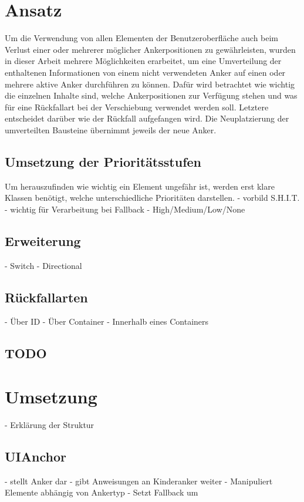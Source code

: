 	\section{Ansatz}
		Um die Verwendung von allen Elementen der Benutzeroberfläche auch beim Verlust einer oder mehrerer möglicher Ankerpositionen zu gewährleisten, wurden in dieser Arbeit mehrere Möglichkeiten erarbeitet, um eine Umverteilung der enthaltenen Informationen von einem nicht verwendeten Anker auf einen oder mehrere aktive Anker durchführen zu können.
		Dafür wird betrachtet wie wichtig die einzelnen Inhalte sind, welche Ankerpositionen zur Verfügung stehen und was für eine Rückfallart bei der Verschiebung verwendet werden soll. Letztere entscheidet darüber wie der Rückfall aufgefangen wird.
		Die Neuplatzierung der umverteilten Bausteine übernimmt jeweils der neue Anker.
		
		\subsection{Umsetzung der Prioritätsstufen}
			Um herauszufinden wie wichtig ein Element ungefähr ist, werden erst klare Klassen benötigt, welche unterschiedliche Prioritäten darstellen.
			- vorbild S.H.I.T.
			- wichtig für Verarbeitung bei Fallback
			- High/Medium/Low/None
			
		\subsection{Erweiterung}
			- Switch
			- Directional
		
		\subsection{Rückfallarten}
			- Über ID
			- Über Container
			- Innerhalb eines Containers
			
		\subsection{TODO}
			
	\section{Umsetzung}
		- Erklärung der Struktur
			
		\subsection{UIAnchor}
			- stellt Anker dar
			- gibt Anweisungen an Kinderanker weiter
			- Manipuliert Elemente abhängig von Ankertyp
			- Setzt Fallback um
			

